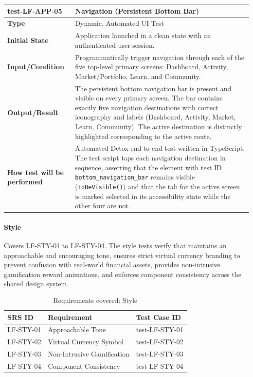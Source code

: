 \documentclass[12pt, titlepage]{article}
\begin{document}
\noindent\begin{tabularx}{\textwidth}{>{\raggedright\arraybackslash}p{3.5cm}X}
  \toprule
  \textbf{test-LF-APP-05}\label{test:LF-APP-05} & \textbf{Navigation (Persistent Bottom Bar)}\\
  \midrule
  \textbf{Type} & Dynamic, Automated UI Test\\
  \textbf{Initial State} & Application launched in a clean state with an authenticated user session.\\
  \textbf{Input/Condition} & Programmatically trigger navigation through each of the five top-level primary screens: Dashboard, Activity, Market/Portfolio, Learn, and Community.\\
  \textbf{Output/Result} & The persistent bottom navigation bar is present and visible on every primary screen. The bar contains exactly five navigation destinations with correct iconography and labels (Dashboard, Activity, Market, Learn, Community). The active destination is distinctly highlighted corresponding to the active route.\\
  \textbf{How test will be performed} & Automated Detox end-to-end test written in TypeScript. The test script taps each navigation destination in sequence, asserting that the element with test ID \texttt{bottom\_}\allowbreak\texttt{navigation\_}\allowbreak\texttt{bar} remains visible (\texttt{toBeVisible()}) and that the tab for the active screen is marked selected in its accessibility state while the other four are not.\\
  \bottomrule
\end{tabularx}

\paragraph{Style}

Covers LF-STY-01 to LF-STY-04. The style tests verify that \progname{} maintains an approachable and encouraging tone, ensures strict virtual currency branding to prevent confusion with real-world financial assets, provides non-intrusive gamification reward animations, and enforces component consistency across the shared design system.

\begin{table}[H]
  \caption{Requirements covered: Style}
  \noindent\begin{tabularx}{\textwidth}{p{3cm}X p{3.5cm}}
  \toprule
  \textbf{SRS ID} & \textbf{Requirement} & \textbf{Test Case ID} \\
  \midrule
  LF-STY-01 & Approachable Tone & test-LF-STY-01 \\
  LF-STY-02 & Virtual Currency Symbol & test-LF-STY-02 \\
  LF-STY-03 & Non-Intrusive Gamification & test-LF-STY-03 \\
  LF-STY-04 & Component Consistency & test-LF-STY-04 \\
  \bottomrule
\end{tabularx}
\end{table}
\end{document}
